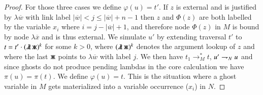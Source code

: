 \documentclass{elsarticle}
\theoremstyle{plain}
\theoremstyle{definition}
\newcommand{\ghostlmd}{{\lambda\mkern-7mu \lambda}}
\newcommand{\ghostvar}{\mathsf{x\mkern-5mu x}}
\def\coresymbol{\pi} %
\newcommand{\core}[1]{\coresymbol(#1)} %
\begin{document}
\begin{proof}
For those three cases we define $\varphi(u) = t'$.
%
If $z$ is external and is justified by $\lambda\overline{w}$ with link label
$|\overline{w}|<j\leq |\overline{w}| + n -1$ then $z$ and $\Phi(z)$ are both labelled by the variable $x_i$ where $i=j-|\overline{w}|+1$, and therefore node $\Phi(z)$ in $M$ is bound by node $\lambda\overline{x}$ and is thus external.
%
We simulate $u'$ by extending traversal $t'$
to $t = t' \cdot (\ghostlmd\, \ghostvar)^k$ for some $k>0$, where
$(\ghostlmd\, \ghostvar)^k$ denotes the argument lookup of $z$ and
where the last $\ghostvar$ points to $\lambda\overline{w}$ with label $j$. We then have $t_1 \rightarrow^*_M t$, $u'\rightharpoondown_N u$
and since ghosts do not produce pending lambdas in the core calculation
we have $\core{u} = \core{t}$. We define $\varphi(u) = t$.
This is the situation where a ghost variable in $M$ gets materialized into a variable occurrence ($x_i$) in $N$.
%


\end{proof}
\end{document}
